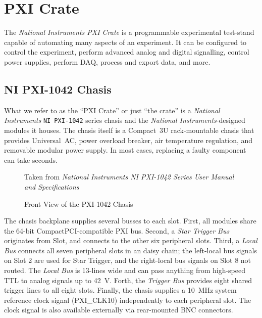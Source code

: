 \section{PXI Crate}
\label{sec:eq_pxi}

The \textit{National Instruments \gls{PXI Crate}} is a programmable experimental test-stand capable of automating many aspects of an experiment.  It can be configured to control the experiment, perform advanced analog and digital signalling, control power supplies, perform \gls{DAQ}, process and export data, and more.

\subsection{NI PXI-1042 Chasis}
\label{sec:eq_pxi:chasis}

What we refer to as the ``PXI Crate'' or just ``the crate'' is a \textit{National Instruments} \texttt{NI PXI-1042} series chasis and the \textit{National Instruments}-designed modules it houses.  The chasis itself is a Compact~3U rack-mountable chasis that provides Universal~AC, power overload breaker, air temperature regulation, and removable modular power supply.  In most cases, replacing a faulty component can take seconds.

\begin{figure}[htbp]
  \centering
  {\tiny
    Taken from \textit{National Instruments NI PXI-1042 Series User Manual and Specifications}
  }
  \caption{Front View of the PXI-1042 Chasis}
  \label{fig:eq_pxi:chasis_front}
\end{figure}

The chasis backplane supplies several busses to each slot.  First, all modules share the 64-bit CompactPCI-compatible PXI bus.  Second, a \textit{Star Trigger Bus} originates from Slot\pxislottwo, and connects to the other six peripheral slots.  Third, a \textit{Local Bus} connects all seven peripheral slots in an daisy chain; the left-local bus signals on Slot 2 are used for Star Trigger, and the right-local bus signals on Slot 8 not routed.  The \textit{Local Bus} is 13-lines wide and can pass anything from high-speed TTL to analog signals up to 42~V.  Forth, the \textit{Trigger Bus} provides eight shared trigger lines to all eight slots.  Finally, the chasis supplies a 10~MHz system reference clock signal (PXI\_CLK10) independently to each peripheral slot.  The clock signal is also available externally via rear-mounted BNC connectors.

